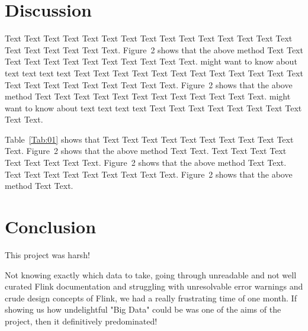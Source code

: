\documentclass{bioinfo}
\begin{document}
\section{Discussion}

Text Text Text Text Text Text  Text Text Text Text Text Text Text
Text Text  Text Text Text Text Text Text.
Figure~2\vphantom{\ref{fig:02}} shows that the above method  Text
Text Text Text  Text Text Text Text Text Text  Text Text.
\citealp{Boffelli03} might want to know about  text text text text
Text Text Text Text Text Text  Text Text Text Text Text Text Text
Text Text  Text Text Text Text Text Text.
Figure~2\vphantom{\ref{fig:02}} shows that the above method  Text
Text Text Text  Text Text Text Text Text Text  Text Text.
\citealp{Boffelli03} might want to know about  text text text text
Text Text Text Text Text Text Text Text Text Text.




Table~\ref{Tab:01} shows that Text Text Text Text Text  Text Text
Text Text Text Text. Figure~2\vphantom{\ref{fig:02}} shows that
the above method Text Text. Text Text Text  Text Text Text Text
Text Text. Figure~2\vphantom{\ref{fig:02}} shows that the above
method Text Text. Text Text Text  Text Text Text Text Text Text.
Figure~2\vphantom{\ref{fig:02}} shows that the above method Text
Text.









%
%






\section{Conclusion}

This project was harsh!

Not knowing exactly which data to take, going through unreadable and not well curated Flink documentation and struggling with unresolvable error warnings and crude design concepts of Flink, we had a really frustrating time of one month.
If showing us how undelightful "Big Data" could be was one of the aims of the project, then it definitively predominated!
\end{document}
